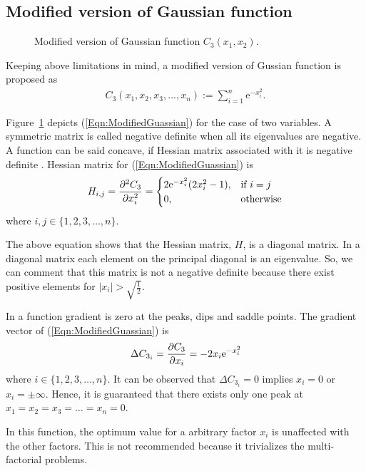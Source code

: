 \documentclass[twocolumn]{svjour3}          %
\newcommand{\me}{\mathrm{e}}
\begin{document}
\subsection{Modified version of Gaussian function}
\begin{figure}
	\centering
	\label{Fig:2GussianFunctionModified}
	\caption{Modified version of Gaussian function $C_3(x_1, x_2)$.}
\end{figure}
Keeping above limitations in mind, a modified version of Gussian function is proposed as
\begin{eqnarray}
	C_3(x_1, x_2, x_3, ..., x_n) := \sum_{i=1}^{n}{\me^{-x_i^2}}. \label{Eqn:ModifiedGuassian}
\end{eqnarray}
\par
Figure~\ref{Fig:2GussianFunctionModified} depicts (\ref{Eqn:ModifiedGuassian}) for the case of two variables. A symmetric matrix is called negative definite when all its eigenvalues are negative. A function can be said concave, if Hessian matrix associated with it is negative definite \cite{bernstein1962some}. Hessian matrix for (\ref{Eqn:ModifiedGuassian}) is 
\begin{eqnarray}
	H_{i,j} = \pdv[2]{C_3}{x_i} =
	\begin{cases}
		2\me^{-x_i^2}(2x_i^2-1)	,	& \text{if } i = j\\
		0						,	& \text{otherwise}
	\end{cases} \label{Eqn:HessianMatrix}
\end{eqnarray}
where $i, j \in \{1, 2, 3, \dots, n\}$.
\par
The above equation shows that the Hessian matrix, $H$, is a diagonal matrix. In a diagonal matrix each element on the principal diagonal is an eigenvalue. So, we can comment that this matrix is not a negative definite because there exist positive elements for $|x_i|>\sqrt{\frac{1}{2}}$.
\par
In a function gradient is zero at the peaks, dips and saddle points. The gradient vector of (\ref{Eqn:ModifiedGuassian}) is
\begin{eqnarray}
	\Delta C_{3_i} = \pdv{C_3}{x_i} = -2x_i\me^{-x_i^2} \label{Eqn:GradientModifiedGuassian}
\end{eqnarray}
where $i \in \{1, 2, 3, \dots, n\}$. It can be observed that $\Delta C_{3_i} = 0$ implies $x_i =0$ or $x_i=\pm\infty$. Hence, it is guaranteed that there exists only one peak at $x_1 = x_2 = x_3 = \dots = x_n = 0$.
\par
In this function, the optimum value for a arbitrary factor $x_i$ is unaffected with the other factors. This is not recommended because it trivializes the multi-factorial problems.
\end{document}
